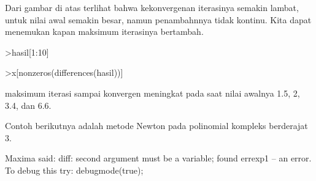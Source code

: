 \documentclass[a4paper,10pt]{article}
\begin{document}
\begin{eulernotebook}
\begin{eulercomment}
\begin{eulercomment}
\begin{eulercomment}
\begin{eulercomment}
\begin{eulercomment}
\begin{eulercomment}
\begin{eulercomment}
\begin{eulercomment}
\begin{eulercomment}
\begin{eulercomment}
\begin{eulercomment}
\begin{eulercomment}
\begin{eulercomment}
\begin{eulercomment}
\begin{eulercomment}
\begin{eulercomment}
\begin{eulercomment}
\begin{eulercomment}
\begin{eulercomment}
\begin{eulercomment}
\begin{eulercomment}
\begin{eulercomment}
\begin{eulercomment}
\begin{eulercomment}
\begin{eulercomment}
\begin{eulercomment}
\begin{eulercomment}
\begin{eulercomment}
\begin{eulercomment}
\begin{eulercomment}
\begin{eulercomment}
\begin{eulercomment}
\begin{eulercomment}
\begin{eulercomment}
\begin{eulercomment}
\begin{eulercomment}
\begin{eulercomment}
Dari gambar di atas terlihat bahwa kekonvergenan iterasinya semakin
lambat, untuk nilai awal semakin besar, namun penambahnnya tidak
kontinu. Kita dapat menemukan kapan maksimum iterasinya bertambah.
\end{eulercomment}
\begin{eulerprompt}
>hasil[1:10]
\end{eulerprompt}
\begin{euleroutput}
  [4,  5,  5,  5,  5,  5,  6,  6,  6,  6]
\end{euleroutput}
\begin{eulerprompt}
>x[nonzeros(differences(hasil))]
\end{eulerprompt}
\begin{euleroutput}
  [1.5,  2,  3.4,  6.6]
\end{euleroutput}
\begin{eulercomment}
maksimum iterasi sampai konvergen meningkat pada saat nilai awalnya
1.5, 2, 3.4, dan 6.6.

Contoh berikutnya adalah metode Newton pada polinomial kompleks
berderajat 3.
\end{eulercomment}
\begin{euleroutput}
  Maxima said:
  diff: second argument must be a variable; found errexp1
   -- an error. To debug this try: debugmode(true);
  

\end{euleroutput}
\end{eulercomment}
\end{eulercomment}
\end{eulercomment}
\end{eulercomment}
\end{eulercomment}
\end{eulercomment}
\end{eulercomment}
\end{eulercomment}
\end{eulercomment}
\end{eulercomment}
\end{eulercomment}
\end{eulercomment}
\end{eulercomment}
\end{eulercomment}
\end{eulercomment}
\end{eulercomment}
\end{eulercomment}
\end{eulercomment}
\end{eulercomment}
\end{eulercomment}
\end{eulercomment}
\end{eulercomment}
\end{eulercomment}
\end{eulercomment}
\end{eulercomment}
\end{eulercomment}
\end{eulercomment}
\end{eulercomment}
\end{eulercomment}
\end{eulercomment}
\end{eulercomment}
\end{eulercomment}
\end{eulercomment}
\end{eulercomment}
\end{eulercomment}
\end{eulercomment}
\end{eulernotebook}
\end{document}

